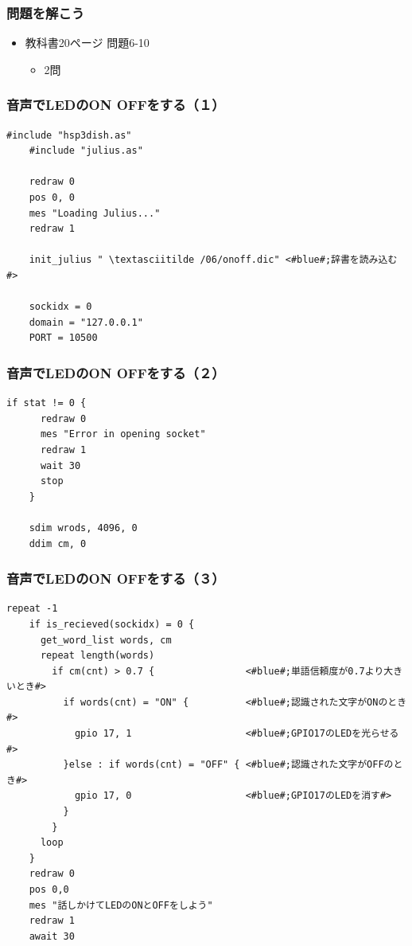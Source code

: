 \documentclass[14pt]{beamer}
\begin{document}
\begin{frame}
  \frametitle{問題を解こう}
  \begin{itemize}
    \item 教科書20ページ 問題6-10
    \begin{itemize}
      \item 2問
    \end{itemize}
  \end{itemize}
\end{frame}

\begin{frame}[fragile]
  \frametitle{音声でLEDのON OFFをする（１）}
  \begin{lstlisting}[caption=ledvoice.hsp,label=ledvoice.hsp]
    #include "hsp3dish.as"
    #include "julius.as"

    redraw 0
    pos 0, 0
    mes "Loading Julius..."
    redraw 1

    init_julius " \textasciitilde /06/onoff.dic" <#blue#;辞書を読み込む#>

    sockidx = 0
    domain = "127.0.0.1"
    PORT = 10500
  \end{lstlisting}
\end{frame}

\begin{frame}[fragile]
  \frametitle{音声でLEDのON OFFをする（２）}
  \begin{lstlisting}[caption=ledvoice.hsp,label=ledvoice.hsp]
    if stat != 0 {
      redraw 0
      mes "Error in opening socket"
      redraw 1
      wait 30
      stop
    }

    sdim wrods, 4096, 0
    ddim cm, 0
  \end{lstlisting}
\end{frame}

\begin{frame}[fragile]
  \frametitle{音声でLEDのON OFFをする（３）}
  \begin{lstlisting}[caption=ledvoice.hsp,label=ledvoice.hsp,basicstyle=\scriptsize]
    repeat -1
    if is_recieved(sockidx) = 0 {
      get_word_list words, cm
      repeat length(words)
        if cm(cnt) > 0.7 {                <#blue#;単語信頼度が0.7より大きいとき#>
          if words(cnt) = "ON" {          <#blue#;認識された文字がONのとき#>
            gpio 17, 1                    <#blue#;GPIO17のLEDを光らせる#>
          }else : if words(cnt) = "OFF" { <#blue#;認識された文字がOFFのとき#>
            gpio 17, 0                    <#blue#;GPIO17のLEDを消す#>
          }
        }
      loop
    }
    redraw 0
    pos 0,0
    mes "話しかけてLEDのONとOFFをしよう"
    redraw 1
    await 30
  \end{lstlisting}
\end{frame}
\end{document}
